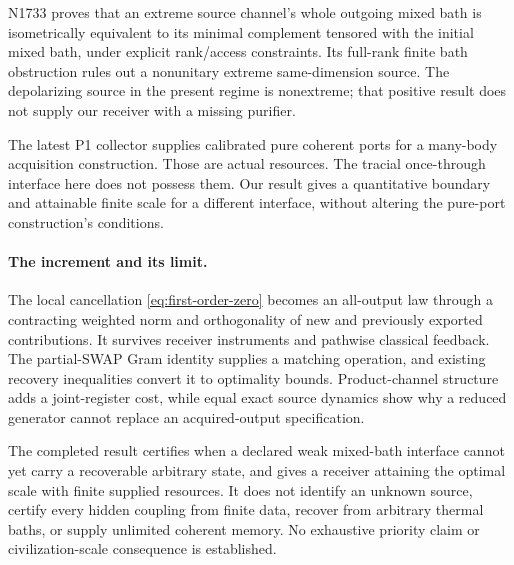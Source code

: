 \documentclass[11pt]{article}
\numberwithin{equation}{section}
\theoremstyle{remark}
\begin{document}
N1733 proves that an extreme source channel's whole outgoing mixed bath is
isometrically equivalent to its minimal complement tensored with the initial
mixed bath, under explicit rank/access constraints. Its full-rank finite
bath obstruction rules out a nonunitary extreme same-dimension source.
The depolarizing source in the present regime is nonextreme; that positive
result does not supply our receiver with a missing purifier.

The latest P1 collector supplies calibrated pure coherent ports for a
many-body acquisition construction. Those are actual resources.
The tracial once-through interface here does not possess them. Our result
gives a quantitative boundary and attainable finite scale for a different
interface, without altering the pure-port construction's conditions.

\paragraph{The increment and its limit.}
The local cancellation \eqref{eq:first-order-zero} becomes an all-output law
through a contracting weighted norm and orthogonality of new and previously
exported contributions. It survives receiver instruments and pathwise
classical feedback. The partial-SWAP Gram identity supplies a matching
operation, and existing recovery inequalities convert it to optimality
bounds. Product-channel structure adds a joint-register cost, while equal
exact source dynamics show why a reduced generator cannot replace an
acquired-output specification.

The completed result certifies when a declared weak mixed-bath interface
cannot yet carry a recoverable arbitrary state, and gives a receiver attaining
the optimal scale with finite supplied resources. It does not identify an
unknown source, certify every hidden coupling from finite data, recover from
arbitrary thermal baths, or supply unlimited coherent memory. No exhaustive
priority claim or civilization-scale consequence is established.
\end{document}
